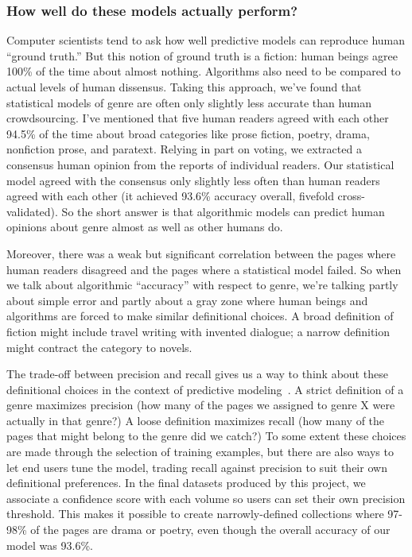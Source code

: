 \documentclass[paper=a4, fontsize=12pt]{scrartcl}
\numberwithin{equation}{section}		%
\numberwithin{figure}{section}			%
\numberwithin{table}{section}				%
\begin{document}
\subsubsection{How well do these models actually perform?}

Computer scientists tend to ask how well predictive models can reproduce human ``ground truth.'' But this notion of ground truth is a fiction: human beings agree 100\% of the time about almost nothing. Algorithms also need to be compared to actual levels of human dissensus. Taking this approach, we've found that statistical models of genre are often only slightly less accurate than human crowdsourcing. I've mentioned that five human readers agreed with each other 94.5\% of the time about broad categories like prose fiction, poetry, drama, nonfiction prose, and paratext. Relying in part on voting, we extracted a consensus human opinion from the reports of individual readers. Our statistical model agreed with the consensus only slightly less often than human readers agreed with each other (it achieved 93.6\% accuracy overall, fivefold cross-validated). So the short answer is that algorithmic models can predict human opinions about genre almost as well as other humans do.

Moreover, there was a weak but significant correlation between the pages where human readers disagreed and the pages where a statistical model failed. So when we talk about algorithmic ``accuracy'' with respect to genre, we're talking partly about simple error and partly about a gray zone where human beings and algorithms are forced to make similar definitional choices. A broad definition of fiction might include travel writing with invented dialogue; a narrow definition might contract the category to novels.

The trade-off between precision and recall gives us a way to think about these definitional choices in the context of predictive modeling~\cite{buckland:recall}. A strict definition of a genre maximizes precision (how many of the pages we assigned to genre X were actually in that genre?) A loose definition maximizes recall (how many of the pages that might belong to the genre did we catch?) To some extent these choices are made through the selection of training examples, but there are also ways to let end users tune the model, trading recall against precision to suit their own definitional preferences. In the final datasets produced by this project, we associate a confidence score with each volume so users can set their own precision threshold. This makes it possible to create narrowly-defined collections where 97-98\% of the pages are drama or poetry, even though the overall accuracy of our model was 93.6\%.
\end{document}
